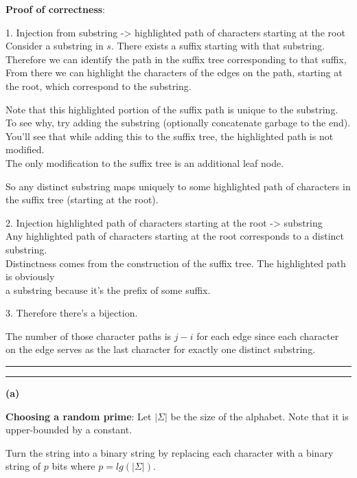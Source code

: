 \documentclass[11pt]{article}
\newcommand{\question}[2] {\vspace{.25in} \hrule\vspace{0.5em}
\noindent{\bf #1: #2} \vspace{0.5em}
\hrule \vspace{.10in}}
\renewcommand{\part}[1] {\vspace{.10in} {\bf (#1)}}
\begin{document}
\textbf{Proof of correctness}:

1. Injection from substring -> highlighted path of characters starting at the root\\
Consider a substring in $s$. There exists a suffix starting with that substring.\\
Therefore we can identify the path in the suffix tree corresponding to that suffix,\\
From there we can highlight the characters of the edges on the path, starting at the root, which correspond to the substring.

Note that this highlighted portion of the suffix path is unique to the substring.\\
To see why, try adding the substring (optionally concatenate garbage to the end).\\
You'll see that while adding this to the suffix tree, the highlighted path is not modified.\\
The only modification to the suffix tree is an additional leaf node.

So any distinct substring maps uniquely to some highlighted path of characters in the suffix tree (starting at the root).


2. Injection highlighted path of characters starting at the root -> substring\\
Any highlighted path of characters starting at the root corresponds to a distinct substring.\\
Distinctness comes from the construction of the suffix tree. The highlighted path is obviously\\
a substring because it's the prefix of some suffix.

3. Therefore there's a bijection.

The number of those character paths is $j-i$ for each edge since each character on the edge serves as the last character for exactly one distinct substring.





\question{3}{LDIS}
\part{a}

\textbf{Choosing a random prime}:
Let $|\Sigma|$ be the size of the alphabet. Note that it is upper-bounded by a constant.

Turn the string into a binary string by replacing each character with a binary string of $p$ bits where $p = lg(|\Sigma|)$.
\end{document}
